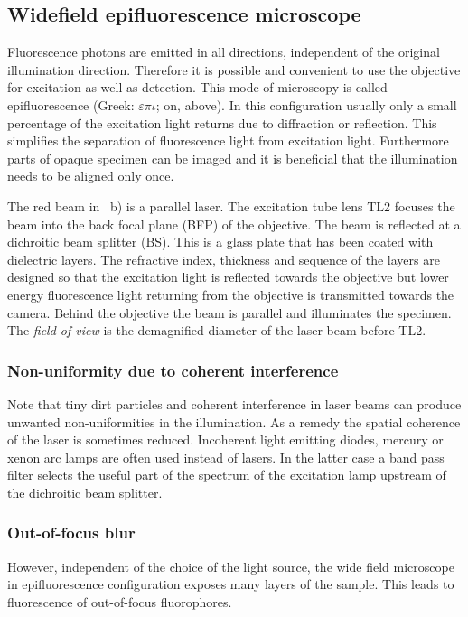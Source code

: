 \subsection{Widefield epifluorescence microscope}
Fluorescence photons are emitted in all directions, independent of the
original illumination direction. Therefore it is possible and
convenient to use the objective for excitation as well as
detection. This mode of microscopy is called epifluorescence (Greek:
$\varepsilon\pi\iota$; on, above).  In this configuration usually only
a small percentage of the excitation light returns due to diffraction
or reflection. This simplifies the separation of fluorescence light
from excitation light.  Furthermore parts of opaque specimen can be
imaged and it is beneficial that the illumination needs to be aligned
only once.


The red beam in ~b) is a parallel
laser. The excitation tube lens TL2 focuses the beam into the back
focal plane (BFP) of the objective. The beam is reflected at a
dichroitic beam splitter (BS). This is a glass plate that has been
coated with dielectric layers. The refractive index, thickness and
sequence of the layers are designed so that the excitation light is
reflected towards the objective but lower energy fluorescence light
returning from the objective is transmitted towards the camera. Behind
the objective the beam is parallel and illuminates the specimen. The
\emph{field of view} is the demagnified diameter of the laser beam
before TL2.
\subsubsection*{Non-uniformity due to coherent interference}
Note that tiny dirt particles and coherent interference in laser beams
can produce unwanted non-uniformities in the illumination. As a remedy
the spatial coherence of the laser is sometimes reduced.  Incoherent
light emitting diodes, mercury or xenon arc lamps are often used
instead of lasers. In the latter case a band pass filter selects the
useful part of the spectrum of the excitation lamp upstream of the
dichroitic beam splitter.

\subsubsection{Out-of-focus blur}
However, independent of the choice of the light source, the wide field
microscope in epifluorescence configuration exposes many layers of the
sample. This leads to fluorescence of out-of-focus fluorophores.

